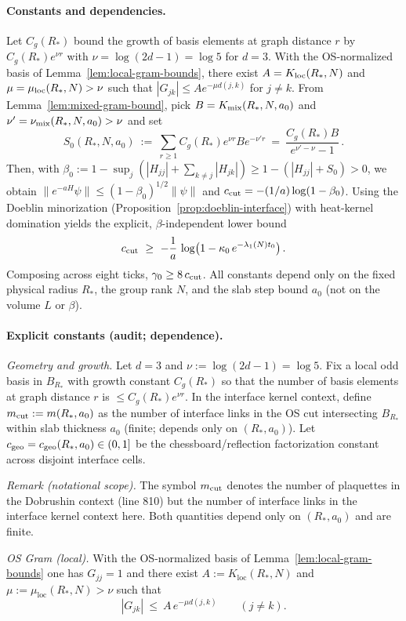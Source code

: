 \documentclass[11pt]{amsart}
\begin{document}
\paragraph{Constants and dependencies.}
Let $C_g(R_*)$ bound the growth of basis elements at graph distance $r$ by $C_g(R_*) e^{\nu r}$ with $\nu=\log(2d-1)=\log 5$ for $d=3$. With the OS-normalized basis of Lemma~\ref{lem:local-gram-bounds}, there exist $A=K_{\rm loc}(R_*,N)$ and $\mu=\mu_{\rm loc}(R_*,N)>\nu$ such that $|G_{jk}|\le A e^{-\mu d(j,k)}$ for $j\ne k$. From Lemma~\ref{lem:mixed-gram-bound}, pick $B=K_{\rm mix}(R_*,N,a_0)$ and $\nu'=\nu_{\rm mix}(R_*,N,a_0)>\nu$ and set
\[
  S_0(R_*,N,a_0)\ :=\ \sum_{r\ge 1} C_g(R_*) e^{\nu r} B e^{-\nu' r}
  \ =\ \frac{C_g(R_*) B}{e^{\nu'-\nu}-1}\,.
\]
Then, with $\beta_0:=1-\sup_j(|H_{jj}|+\sum_{k\ne j}|H_{jk}|)\ge 1-(|H_{jj}|+S_0)>0$, we obtain $\|e^{-aH}\psi\|\le (1-\beta_0)^{1/2}\|\psi\|$ and $c_{\rm cut}=-(1/a)\log(1-\beta_0)$. Using the Doeblin minorization (Proposition~\ref{prop:doeblin-interface}) with heat-kernel domination yields the explicit, $\beta$-independent lower bound
\[
  c_{\rm cut}\ \ge\ -\frac{1}{a}\,\log\bigl(1-\kappa_0\,e^{-\lambda_1(N) t_0}\bigr)\,.
\]
Composing across eight ticks, $\gamma_0\ge 8\,c_{\rm cut}$. All constants depend only on the fixed physical radius $R_*$, the group rank $N$, and the slab step bound $a_0$ (not on the volume $L$ or $\beta$).

\paragraph{Explicit constants (audit; dependence).}
\emph{Geometry and growth.} Let $d=3$ and $\nu:=\log(2d-1)=\log 5$. Fix a local odd basis in $B_{R_*}$ with growth constant $C_g(R_*)$ so that the number of basis elements at graph distance $r$ is $\le C_g(R_*) e^{\nu r}$. In the interface kernel context, define $m_{\rm cut}:=m(R_*,a_0)$ as the number of interface links in the OS cut intersecting $B_{R_*}$ within slab thickness $a_0$ (finite; depends only on $(R_*,a_0)$). Let $c_{\rm geo}=c_{\rm geo}(R_*,a_0)\in(0,1]$ be the chessboard/reflection factorization constant across disjoint interface cells.

\emph{Remark (notational scope).} The symbol $m_{\rm cut}$ denotes the number of plaquettes in the Dobrushin context (line 810) but the number of interface links in the interface kernel context here. Both quantities depend only on $(R_*,a_0)$ and are finite.

\emph{OS Gram (local).} With the OS-normalized basis of Lemma~\ref{lem:local-gram-bounds} one has $G_{jj}=1$ and there exist $A:=K_{\mathrm{loc}}(R_*,N)$ and $\mu:=\mu_{\mathrm{loc}}(R_*,N)>\nu$ such that
\[
  |G_{jk}|\ \le\ A\,e^{-\mu d(j,k)}\qquad (j\ne k).
\]
\end{document}
